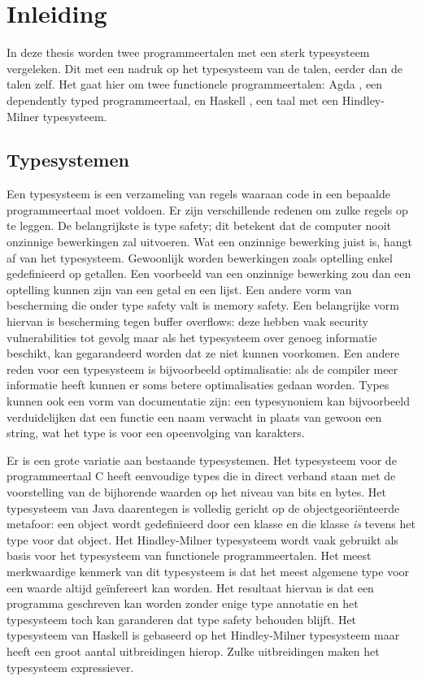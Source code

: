 \chapter{Inleiding}
\label{inleiding}

In deze thesis worden twee programmeertalen met een sterk typesysteem
vergeleken. Dit met een nadruk op het typesysteem van de talen, eerder dan de
talen zelf. Het gaat hier om twee functionele programmeertalen: Agda
\cite{agda}, een dependently typed programmeertaal, en Haskell \cite{haskell},
een taal met een Hindley-Milner \cite{hindley} typesysteem.


\section{Typesystemen}

Een typesysteem is een verzameling van regels waaraan code in een bepaalde
programmeertaal moet voldoen. Er zijn verschillende redenen om zulke regels op
te leggen. De belangrijkste is type safety; dit betekent dat de computer nooit
onzinnige bewerkingen zal uitvoeren. Wat een onzinnige bewerking juist is,
hangt af van het typesysteem. Gewoonlijk worden bewerkingen zoals optelling
enkel gedefinieerd op getallen. Een voorbeeld van een onzinnige bewerking zou
dan een optelling kunnen zijn van een getal en een lijst. Een andere vorm van
bescherming die onder type safety valt is memory safety. Een belangrijke vorm
hiervan is bescherming tegen buffer overflows: deze hebben vaak security
vulnerabilities tot gevolg maar als het typesysteem over genoeg informatie
beschikt, kan gegarandeerd worden dat ze niet kunnen voorkomen.  Een andere
reden voor een typesysteem is bijvoorbeeld optimalisatie: als de compiler meer
informatie heeft kunnen er soms betere optimalisaties gedaan worden. Types
kunnen ook een vorm van documentatie zijn: een typesynoniem kan bijvoorbeeld
verduidelijken dat een functie een naam verwacht in plaats van gewoon een
string, wat het type is voor een opeenvolging van karakters.

Er is een grote variatie aan bestaande typesystemen. Het typesysteem voor de
programmeertaal C \cite{C} heeft eenvoudige types die in direct verband staan
met de voorstelling van de bijhorende waarden op het niveau van bits en bytes.
Het typesysteem van Java \cite{Java} daarentegen is volledig gericht op de
objectgeoriënteerde metafoor: een object wordt gedefinieerd door een klasse en
die klasse \emph{is} tevens het type voor dat object. Het Hindley-Milner
typesysteem wordt vaak gebruikt als basis voor het typesysteem van functionele
programmeertalen. Het meest merkwaardige kenmerk van dit typesysteem is dat het
meest algemene type voor een waarde altijd geïnfereert kan worden. Het
resultaat hiervan is dat een programma geschreven kan worden zonder enige type
annotatie en het typesysteem toch kan garanderen dat type safety behouden
blijft. Het typesysteem van Haskell is gebaseerd op het Hindley-Milner
typesysteem maar heeft een groot aantal uitbreidingen hierop. Zulke
uitbreidingen maken het typesysteem expressiever.



